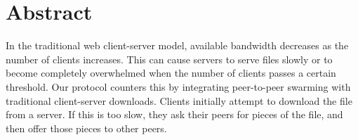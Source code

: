 \section {Abstract}
In the traditional web client-server model, available bandwidth decreases as the number of clients increases.  
This can cause servers to serve files slowly or to become completely overwhelmed when the number of clients passes a certain threshold.  
Our protocol counters this by integrating peer-to-peer swarming with traditional client-server downloads.  
Clients initially attempt to download the file from a server.  If this is too slow, they ask their peers for pieces of the file, 
and then offer those pieces to other peers.